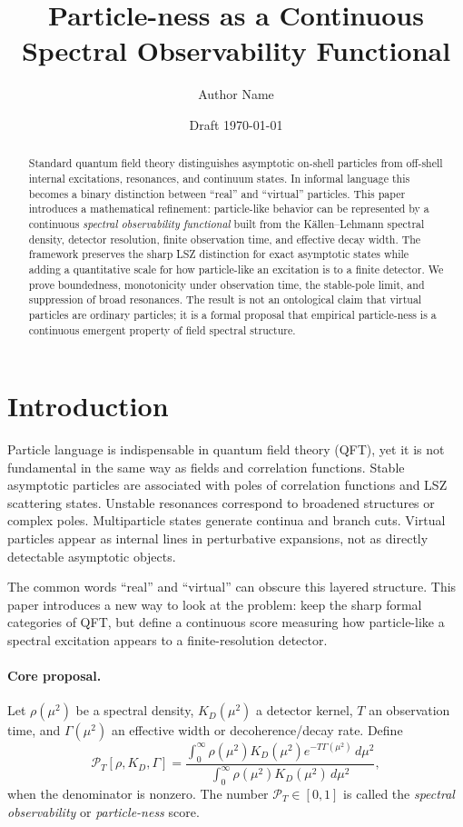\documentclass[11pt]{article}
\title{Particle-ness as a Continuous Spectral Observability Functional}
\author{Author Name}
\affil{Independent Research Draft}
\date{Draft \today}
\theoremstyle{remark}
\begin{document}
\maketitle

\begin{abstract}
Standard quantum field theory distinguishes asymptotic on-shell particles from off-shell internal excitations, resonances, and continuum states. In informal language this becomes a binary distinction between ``real'' and ``virtual'' particles. This paper introduces a mathematical refinement: particle-like behavior can be represented by a continuous \emph{spectral observability functional} built from the K\"allen--Lehmann spectral density, detector resolution, finite observation time, and effective decay width. The framework preserves the sharp LSZ distinction for exact asymptotic states while adding a quantitative scale for how particle-like an excitation is to a finite detector. We prove boundedness, monotonicity under observation time, the stable-pole limit, and suppression of broad resonances. The result is not an ontological claim that virtual particles are ordinary particles; it is a formal proposal that empirical particle-ness is a continuous emergent property of field spectral structure.
\end{abstract}

\tableofcontents

\section{Introduction}

Particle language is indispensable in quantum field theory (QFT), yet it is not fundamental in the same way as fields and correlation functions. Stable asymptotic particles are associated with poles of correlation functions and LSZ scattering states. Unstable resonances correspond to broadened structures or complex poles. Multiparticle states generate continua and branch cuts. Virtual particles appear as internal lines in perturbative expansions, not as directly detectable asymptotic objects.

The common words ``real'' and ``virtual'' can obscure this layered structure. This paper introduces a new way to look at the problem: keep the sharp formal categories of QFT, but define a continuous score measuring how particle-like a spectral excitation appears to a finite-resolution detector.

\paragraph{Core proposal.} Let $\rho(\mu^2)$ be a spectral density, $K_D(\mu^2)$ a detector kernel, $T$ an observation time, and $\Gamma(\mu^2)$ an effective width or decoherence/decay rate. Define
\begin{equation}
\mathcal P_T[\rho,K_D,\Gamma]
= \frac{\int_0^\infty \rho(\mu^2)K_D(\mu^2)e^{-T\Gamma(\mu^2)}\,d\mu^2}
{\int_0^\infty \rho(\mu^2)K_D(\mu^2)\,d\mu^2},
\end{equation}
when the denominator is nonzero. The number $\mathcal P_T\in[0,1]$ is called the \emph{spectral observability} or \emph{particle-ness} score.
\end{document}
